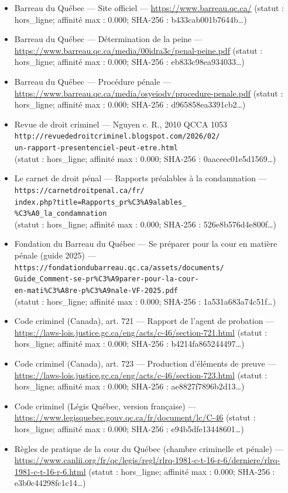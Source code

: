 \documentclass[12pt,letterpaper,oneside]{article}
\begin{document}
\begin{itemize}[leftmargin=*]
\item Barreau du Québec — Site officiel — \url{https://www.barreau.qc.ca/} (statut : hors\_ligne; affinité max : 0.000; SHA-256 : b433cab001b7644b…)
\item Barreau du Québec — Détermination de la peine — \url{https://www.barreau.qc.ca/media/00idra3c/penal-peine.pdf} (statut : hors\_ligne; affinité max : 0.000; SHA-256 : eb833c98ea934033…)
\item Barreau du Québec — Procédure pénale — \url{https://www.barreau.qc.ca/media/osyeiodv/procedure-penale.pdf} (statut : hors\_ligne; affinité max : 0.000; SHA-256 : d965858ea3391cb2…)
\item Revue de droit criminel — Nguyen c. R., 2010 QCCA 1053\\
\texttt{http://revuededroitcriminel.blogspot.com/2026/02/}\\
\texttt{un-rapport-presentenciel-peut-etre.html}\\
{\footnotesize 
(statut : hors\_ligne; affinité max : 0.000; SHA-256 : 0aaceec01e5d1569…)
}
\item Le carnet de droit pénal — Rapports préalables à la condamnation —\\
\texttt{https://carnetdroitpenal.ca/fr/}\\\texttt{index.php?title=Rapports\_pr\%C3\%A9alables\_}\\\texttt{\%C3\%A0\_la\_condamnation}\\
{\footnotesize (statut : hors\_ligne; affinité max : 0.000; SHA-256 : 526e8b576d4e800f…)}
\item Fondation du Barreau du Québec — Se préparer pour la cour en matière pénale (guide 2025) —\\
\texttt{https://fondationdubarreau.qc.ca/assets/documents/}\\\texttt{Guide\_Comment-se-pr\%C3\%A9parer-pour-la-cour-}\\\texttt{en-mati\%C3\%A8re-p\%C3\%A9nale-VF-2025.pdf}\\
{\footnotesize (statut : hors\_ligne; affinité max : 0.000; SHA-256 : 1a531a683a74c51f…)}
\item Code criminel (Canada), art. 721 — Rapport de l'agent de probation — \url{https://laws-lois.justice.gc.ca/eng/acts/c-46/section-721.html} (statut : hors\_ligne; affinité max : 0.000; SHA-256 : b4214fa865244497…)
\item Code criminel (Canada), art. 723 — Production d'éléments de preuve — \url{https://laws-lois.justice.gc.ca/eng/acts/c-46/section-723.html} (statut : hors\_ligne; affinité max : 0.000; SHA-256 : ae8827f7896b2d13…)
\item Code criminel (Légis Québec, version française) — \url{https://www.legisquebec.gouv.qc.ca/fr/document/lc/C-46} (statut : hors\_ligne; affinité max : 0.000; SHA-256 : e94b5dfe13448601…)
\item Règles de pratique de la cour du Québec (chambre criminelle et pénale) — \url{https://www.canlii.org/fr/qc/legis/regl/rlrq-1981-c-t-16-r-6/derniere/rlrq-1981-c-t-16-r-6.html} (statut : hors\_ligne; affinité max : 0.000; SHA-256 : e3b0c44298fc1c14…)


\end{itemize}
\end{document}
